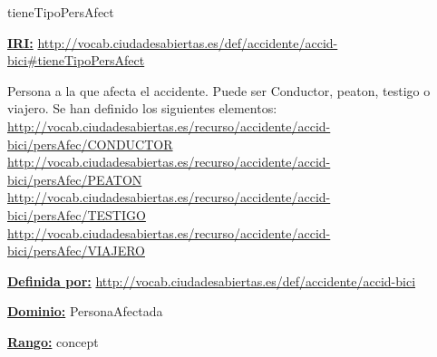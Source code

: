 \begin{mybox}{tieneTipoPersAfect}
\begin{flushleft}
\underline{\textbf{IRI:}}
\url{http://vocab.ciudadesabiertas.es/def/accidente/accid-bici#tieneTipoPersAfect}
\newline

Persona a la que afecta el accidente. Puede ser Conductor, peaton, testigo o viajero. Se han definido los siguientes elementos:
\newline \url{http://vocab.ciudadesabiertas.es/recurso/accidente/accid-bici/persAfec/CONDUCTOR}
\newline \url{http://vocab.ciudadesabiertas.es/recurso/accidente/accid-bici/persAfec/PEATON}
\newline \url{http://vocab.ciudadesabiertas.es/recurso/accidente/accid-bici/persAfec/TESTIGO}
\newline \url{http://vocab.ciudadesabiertas.es/recurso/accidente/accid-bici/persAfec/VIAJERO}
\newline

\underline{\textbf{Definida por:}}
\url{http://vocab.ciudadesabiertas.es/def/accidente/accid-bici}
\newline

\underline{\textbf{Dominio:}}
\newline PersonaAfectada
\newline

\underline{\textbf{Rango:}}
\newline concept
\newline

\end{flushleft}
\end{mybox}






